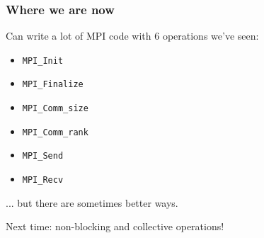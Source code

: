 \documentclass{beamer}
\begin{document}
\begin{frame}
  \frametitle{Where we are now}

  Can write a lot of MPI code with 6 operations we've seen:
  \begin{itemize}
  \item {\tt MPI\_Init}
  \item {\tt MPI\_Finalize}
  \item {\tt MPI\_Comm\_size}
  \item {\tt MPI\_Comm\_rank}
  \item {\tt MPI\_Send}
  \item {\tt MPI\_Recv}
  \end{itemize}
  ... but there are sometimes better ways.
  
  \vspace{5mm}
  Next time: non-blocking and collective operations!
\end{frame}
\end{document}
